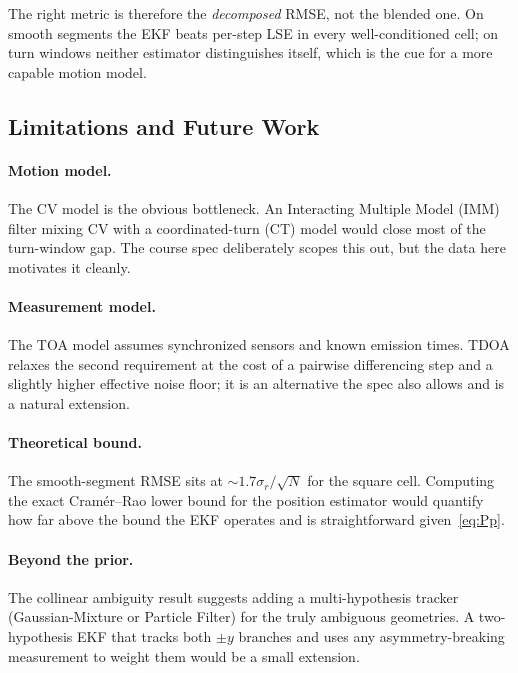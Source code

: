 \documentclass[11pt,a4paper]{article}
\begin{document}
The right metric is therefore the \emph{decomposed} RMSE, not the blended
one.  On smooth segments the EKF beats per-step LSE in every well-conditioned
cell; on turn windows neither estimator distinguishes itself, which is
the cue for a more capable motion model.

\subsection{Limitations and Future Work}

\paragraph{Motion model.}
The CV model is the obvious bottleneck.  An Interacting Multiple Model
(IMM) filter mixing CV with a coordinated-turn (CT) model would close
most of the turn-window gap.  The course spec deliberately scopes this
out, but the data here motivates it cleanly.

\paragraph{Measurement model.}
The TOA model assumes synchronized sensors and known emission times.  TDOA
relaxes the second requirement at the cost of a pairwise differencing step
and a slightly higher effective noise floor; it is an alternative the
spec also allows and is a natural extension.

\paragraph{Theoretical bound.}
The smooth-segment RMSE sits at $\sim$$1.7\sigma_r/\sqrt{N}$ for the
square cell.  Computing the exact Cram\'er--Rao lower bound for the
position estimator would quantify how far above the bound the EKF
operates and is straightforward given~\eqref{eq:Pp}.

\paragraph{Beyond the prior.}
The collinear ambiguity result suggests adding a multi-hypothesis tracker
(Gaussian-Mixture or Particle Filter) for the truly ambiguous geometries.
A two-hypothesis EKF that tracks both $\pm y$ branches and uses any
asymmetry-breaking measurement to weight them would be a small extension.

\end{document}
